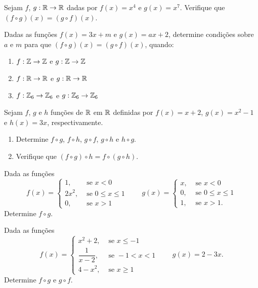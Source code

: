\documentclass[12pt]{exam}
\begin{document}
\vspace{.3cm}

\questao{} Sejam $f$, $g : \mathbb{R} \to \mathbb{R}$ dadas por $f(x) = x^4$ e $g(x) = x^7$. Verifique que $(f\circ g)(x) = (g\circ f)(x)$.

\vspace{.3cm}

\questao{} Dadas as funções $f(x) = 3x + m$ e $g(x) = ax + 2$, determine condições sobre $a$ e $m$ para que $(f\circ g)(x) = (g\circ f)(x)$, quando:
\begin{enumerate}[label={\roman*})]
    \item $f : \mathbb{Z} \to \mathbb{Z}$ e $g : \mathbb{Z} \to \mathbb{Z}$
    \item $f : \mathbb{R} \to \mathbb{R}$ e $g : \mathbb{R} \to \mathbb{R}$
    \item $f : \mathbb{Z}_6 \to \mathbb{Z}_6$ e $g : \mathbb{Z}_6 \to \mathbb{Z}_6$
\end{enumerate}

\vspace{.3cm}

\questao{} Sejam $f$, $g$ e $h$ funções de $\mathbb{R}$ em $\mathbb{R}$ definidas por $f(x) = x + 2$, $g(x) = x^2 - 1$ e $h(x) = 3x$, respectivamente.
\begin{enumerate}[label={\alph*})]
    \item Determine $f \circ g$, $f \circ h$, $g \circ f$, $g \circ h$ e $h \circ g$.
    \item Verifique que $(f \circ g)\circ h = f \circ (g \circ h)$.
\end{enumerate}

\vspace{.3cm}

\questao{} Dada as funções
\[
f(x) = \begin{cases}
    1, & \mbox{ se } x < 0\\
    2x^2, & \mbox{ se } 0 \le x \le 1\\
    0, & \mbox{ se } x > 1
\end{cases} \qquad g(x) = \begin{cases}
    x, & \mbox{ se } x < 0\\
    0, & \mbox{ se } 0 \le x \le 1\\
    1, & \mbox{ se } x > 1.
\end{cases}
\]
Determine $f\circ g$.

\vspace{.3cm}

\questao{} Dada as funções
\[
f(x) = \begin{cases}
    x^2 + 2, & \mbox{ se } x \le -1\\
    \dfrac{1}{x - 2}, & \mbox{ se } -1 < x < 1\\
    4 - x^2, & \mbox{ se } x \ge 1
\end{cases} \qquad g(x) = 2 - 3x.
\]
Determine $f\circ g$ e $g \circ f$.
\end{document}

